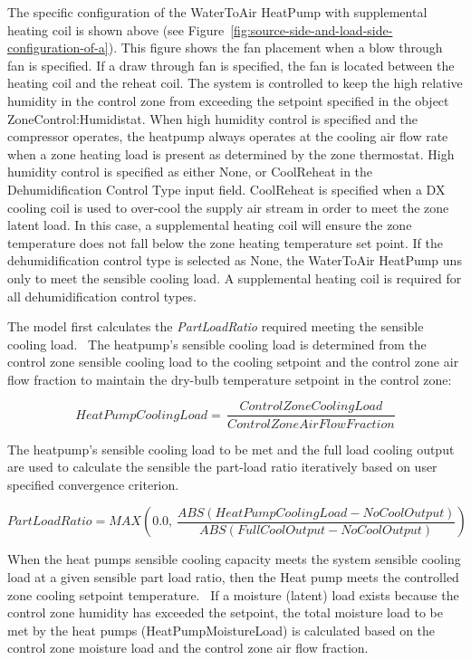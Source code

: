 The specific configuration of the WaterToAir HeatPump with supplemental heating coil is shown above (see Figure~\ref{fig:source-side-and-load-side-configuration-of-a}). This figure shows the fan placement when a blow through fan is specified. If a draw through fan is specified, the fan is located between the heating coil and the reheat coil. The system is controlled to keep the high relative humidity in the control zone from exceeding the setpoint specified in the object ZoneControl:Humidistat. When high humidity control is specified and the compressor operates, the heatpump always operates at the cooling air flow rate when a zone heating load is present as determined by the zone thermostat. High humidity control is specified as either None, or CoolReheat in the Dehumidification Control Type input field. CoolReheat is specified when a DX cooling coil is used to over-cool the supply air stream in order to meet the zone latent load. In this case, a supplemental heating coil will ensure the zone temperature does not fall below the zone heating temperature set point. If the dehumidification control type is selected as None, the WaterToAir HeatPump uns only to meet the sensible cooling load. A supplemental heating coil is required for all dehumidification control types.

The model first calculates the \emph{PartLoadRatio} required meeting the sensible cooling load.~ The heatpump's sensible cooling load is determined from the control zone sensible cooling load to the cooling setpoint and the control zone air flow fraction to maintain the dry-bulb temperature setpoint in the control zone:

\begin{equation}
HeatPumpCoolingLoad = \,\frac{{ControlZoneCoolingLoad}}{{ControlZoneAirFlowFraction}}
\end{equation}

The heatpump's sensible cooling load to be met and the full load cooling output are used to calculate the sensible the part-load ratio iteratively based on user specified convergence criterion.

\begin{equation}
PartLoadRatio = MAX\left( {0.0,\,\frac{{ABS\left( {HeatPumpCoolingLoad - NoCoolOutput} \right)}}{{ABS\left( {FullCoolOutput - NoCoolOutput} \right)}}} \right)
\end{equation}

When the heat pumps sensible cooling capacity meets the system sensible cooling load at a given sensible part load ratio, then the Heat pump meets the controlled zone cooling setpoint temperature.~ If a moisture (latent) load exists because the control zone humidity has exceeded the setpoint, the total moisture load to be met by the heat pumps (HeatPumpMoistureLoad) is calculated based on the control zone moisture load and the control zone air flow fraction.

